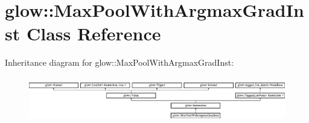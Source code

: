 \hypertarget{classglow_1_1_max_pool_with_argmax_grad_inst}{}\section{glow\+:\+:Max\+Pool\+With\+Argmax\+Grad\+Inst Class Reference}
\label{classglow_1_1_max_pool_with_argmax_grad_inst}
Inheritance diagram for glow\+:\+:Max\+Pool\+With\+Argmax\+Grad\+Inst\+:\begin{figure}[H]
\begin{center}
\leavevmode
\includegraphics[height=1.991111cm]{classglow_1_1_max_pool_with_argmax_grad_inst}
\end{center}
\end{figure}
